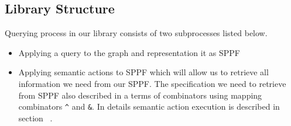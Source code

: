 
\subsection{Library Structure}

Querying process in our library consists of two subprocesses listed below.
\begin{itemize}
\item Applying a query to the graph and representation it as SPPF
\item Applying semantic actions to SPPF which will allow us to retrieve all information we need from our SPPF. 
The specification we need to retrieve from SPPF also described in a terms of combinators using mapping combinators \lstinline{^} and \lstinline{&}.
In details semantic action execution is described in section~\label{sec:semanticActions} .
\end{itemize}


